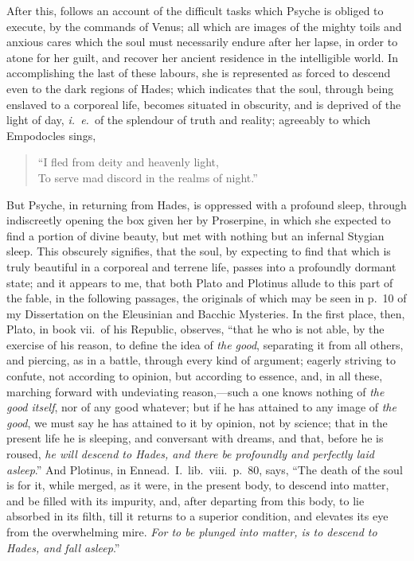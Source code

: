 \documentclass{article}
\begin{document}
{After this, follows an account of the difficult tasks which Psyche is obliged
to execute, by the commands of Venus; all which are images of the mighty toils
and anxious cares which the soul must necessarily endure after her lapse, in
order to atone for her guilt, and recover her ancient residence in the
intelligible world. In accomplishing the last of these labours, she is
represented as forced to descend even to the dark regions of Hades; which
indicates that the soul, through being enslaved to a corporeal life, becomes
situated in obscurity, and is deprived of the light of day, \textit{i.~e.}~of
the splendour of truth and reality; agreeably to which Empodocles sings,

\begin{verse}
``I fled from deity and heavenly light,\\
To serve mad discord in the realms of night.''
\end{verse}

\noindent But Psyche, in returning from Hades, is oppressed with a profound
sleep, through indiscreetly opening the box given her by Proserpine, in which
she expected to find a portion of divine beauty, but met with nothing but an
infernal Stygian sleep. This obscurely signifies, that the soul, by expecting
to find that which is truly beautiful in a corporeal and terrene life, passes
into a profoundly dormant state; and it appears to me, that both Plato and
Plotinus allude to this part of the fable, in the following passages, the
originals of which may be seen in p.~10 of my Dissertation on the Eleusinian
and Bacchic Mysteries. In the first place, then, Plato, in book vii.~of his
Republic, observes, ``that he who is not able, by the exercise of his reason,
to define the idea of \textit{the good}, separating it from all others, and
piercing, as in a battle, through every kind of argument; eagerly striving to
confute, not according to opinion, but according to essence, and, in all these,
marching forward with undeviating reason,---such a one knows nothing of
\textit{the good itself}, nor of any good whatever; but if he has attained to
any image of \textit{the good}, we must say he has attained to it by opinion,
not by science; that in the present life he is sleeping, and conversant with
dreams, and that, before he is roused, \textit{he will descend to Hades, and
there be profoundly and perfectly laid asleep}.'' And Plotinus, in
Ennead.~I.~lib.~viii.~p.~80, says, ``The death of the soul is for it, while
merged, as it were, in the present body, to descend into matter, and be filled
with its impurity, and, after departing from this body, to lie absorbed in its
filth, till it returns to a superior condition, and elevates its eye from the
overwhelming mire. \textit{For to be plunged into matter, is to descend to
Hades, and fall asleep}.''

}
\end{document}
